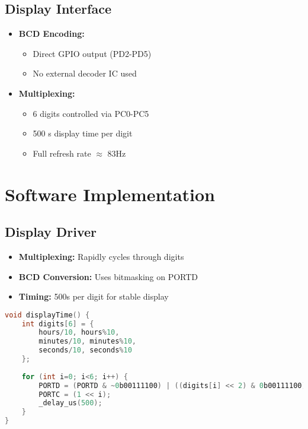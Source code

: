 \documentclass[journal]{IEEEtran}
\begin{document}
\subsection{Display Interface}
\begin{itemize}
    \item \textbf{BCD Encoding:}
    \begin{itemize}
        \item Direct GPIO output (PD2-PD5)
        \item No external decoder IC used
    \end{itemize}
    \item \textbf{Multiplexing:}
    \begin{itemize}
        \item 6 digits controlled via PC0-PC5
        \item 500 \micro s display time per digit
        \item Full refresh rate $\approx$ 83Hz
    \end{itemize}
\end{itemize}

\section{Software Implementation}


\subsection{Display Driver}
\begin{itemize}
    \item \textbf{Multiplexing:} Rapidly cycles through digits
    \item \textbf{BCD Conversion:} Uses bitmasking on PORTD
    \item \textbf{Timing:} 500\micro s per digit for stable display
\end{itemize}

\begin{lstlisting}[language=C,caption=Display Function]
void displayTime() {
    int digits[6] = {
        hours/10, hours%10,
        minutes/10, minutes%10,
        seconds/10, seconds%10
    };
    
    for (int i=0; i<6; i++) {
        PORTD = (PORTD & ~0b00111100) | ((digits[i] << 2) & 0b00111100);
        PORTC = (1 << i);
        _delay_us(500);
    }
}
\end{lstlisting}
\end{document}
